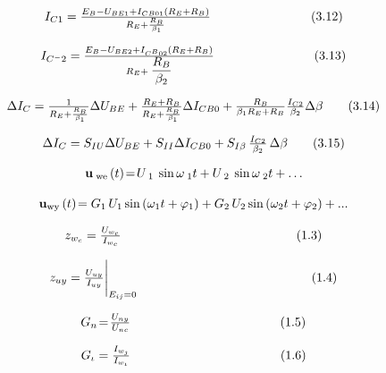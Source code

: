 \documentclass{article}
\begin{document}
\[
$$
I_{C 1}=\frac{E_{B}-U_{B E 1}+I_{C B 0 1} \left( R_{E}+R_{B} \right)} {R_{E}+\frac{R_{B}} {\beta_{1}}} \qquad\qquad\qquad\qquad( 3. 1 2 )
$$
\]

\[
$$
I_{C^{-} 2}=\frac{E_{B}-U_{B E 2}+I_{C^{B} 0 2} \left( R_{E}+R_{B} \right)} {R_{E}+\displaystyle{\frac{R_{B}} {\beta_{2}}}} \qquad\qquad\qquad\qquad( 3. 1 3 )
$$
\]

\[
$$
\Delta I_{C}=\frac{1} {R_{E}+\frac{R_{B}} {\beta_{1}}} \Delta U_{B E}+\frac{R_{E}+R_{B}} {R_{E}+\frac{R_{B}} {\beta_{1}}} \Delta I_{C B 0}+\frac{R_{B}} {\beta_{1} R_{E}+R_{B}} \frac{I_{C 2}} {\beta_{2}} \Delta\beta \tag{3.14}
$$
\]

\[
$$
\Delta I_{C}=S_{I U} \Delta U_{B E}+S_{I I} \Delta I_{C B 0}+S_{I \beta} \, {\frac{I_{C 2}} {\beta_{2}}} \, \Delta\beta \tag{3.15}
$$
\]

\[
$$
{\bf u}_{\mathrm{\tiny~ w e}} \left( t \right) \!=\! U_{\mathrm{\tiny~ 1 ~}} \sin{\omega_{\mathrm{\tiny~ 1}} t}+U_{\mathrm{\tiny~ 2 ~}} \sin{\omega_{\mathrm{\tiny~ 2}} t}+\ldots
$$
\]

\[
$$
{\bf u}_{\mathrm{w y}} \left( t \right) \!=G_{1} \, U_{1} \, \mathrm{s i n} \left( \omega_{1} t+\varphi_{1} \right)+G_{2} \, U_{2} \, \mathrm{s i n} \left( \omega_{2} t+\varphi_{2} \right)+...
$$
\]

\[
$$
z_{w_{c}}={\frac{U_{w_{c}}} {I_{w_{c}}}} \qquad\qquad\qquad\qquad\qquad\qquad\qquad( 1. 3 )
$$
\]

\[
$$
z_{u y}={\frac{U_{u y}} {I_{u y}}} \Bigg|_{E_{i j}=0} \qquad\qquad\qquad\qquad\qquad\qquad\qquad( 1. 4 )
$$
\]

\[
$$
G_{n} \!=\! \frac{U_{n y}} {U_{n c}} \qquad\qquad\qquad\qquad\qquad\qquad( 1. 5 )
$$
\]

\[
$$
G_{\iota}={\frac{I_{w_{\jmath}}} {I_{w_{\iota}}}} \qquad\qquad\qquad\qquad\qquad\qquad( 1. 6 )
$$
\]
\end{document}
